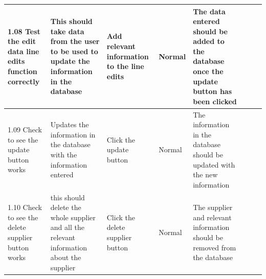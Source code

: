 \begin{landscape}
\begin{center}
\begin{longtable}{|p{1.5cm}|p{2.5cm}|p{2.5cm}|p{2cm}|p{2cm}|p{2cm}|p{2cm}|p{2cm}|}
       	1.08 Test the edit data line edits function correctly & This should take data from the user to be used to update the information in the database & Add relevant information to the line edits & Normal & The data entered should be added to the database once the update button has been clicked &  &  \\ \hline
       	1.09 Check to see the update button works & Updates the information in the database with the information entered & Click the update button & Normal & The information in the database should be updated with the new information &  &  \\ \hline
       	1.10 Check to see the delete supplier button works & this should delete the whole supplier and all the relevant information about the supplier & Click the delete supplier button & Normal & The supplier and relevant information should be removed from the database &  &  \\ \hline
       	
    \end{longtable}
\end{center}
\end{landscape}